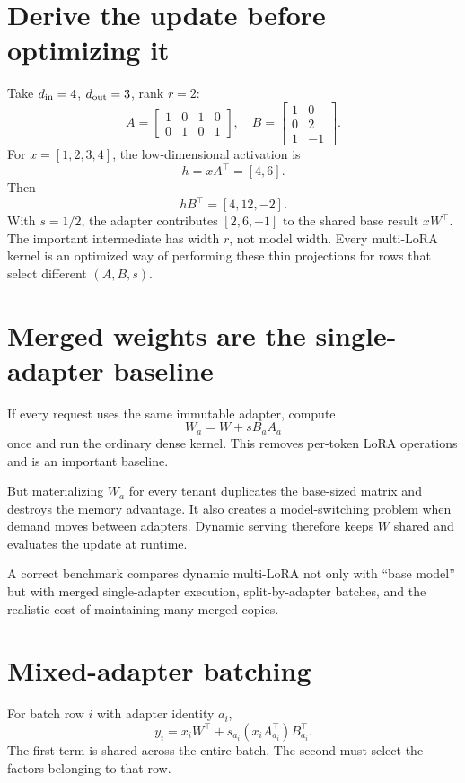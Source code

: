 \section{Derive the update before optimizing it}

Take $d_{\rm in}=4$, $d_{\rm out}=3$, rank $r=2$:
\[
A=\begin{bmatrix}1&0&1&0\\0&1&0&1\end{bmatrix},\quad
B=\begin{bmatrix}1&0\\0&2\\1&-1\end{bmatrix}.
\]
For $x=[1,2,3,4]$, the low-dimensional activation is
\[
h=xA^\top=[4,6].
\]
Then
\[
hB^\top=[4,12,-2].
\]
With $s=1/2$, the adapter contributes $[2,6,-1]$ to the shared base result $xW^\top$.
The important intermediate has width $r$, not model width. Every multi-LoRA kernel is
an optimized way of performing these thin projections for rows that select different
$(A,B,s)$.

\section{Merged weights are the single-adapter baseline}

If every request uses the same immutable adapter, compute
\[
W_a=W+sB_aA_a
\]
once and run the ordinary dense kernel. This removes per-token LoRA operations and is
an important baseline.

But materializing $W_a$ for every tenant duplicates the base-sized matrix and destroys
the memory advantage. It also creates a model-switching problem when demand moves
between adapters. Dynamic serving therefore keeps $W$ shared and evaluates the update
at runtime.

A correct benchmark compares dynamic multi-LoRA not only with ``base model'' but with
merged single-adapter execution, split-by-adapter batches, and the realistic cost of
maintaining many merged copies.

\section{Mixed-adapter batching}

For batch row $i$ with adapter identity $a_i$,
\begin{equation}
y_i=x_iW^\top+s_{a_i}(x_iA_{a_i}^\top)B_{a_i}^\top.
\label{eq:mixed-lora}
\end{equation}
The first term is shared across the entire batch. The second must select the factors
belonging to that row.

